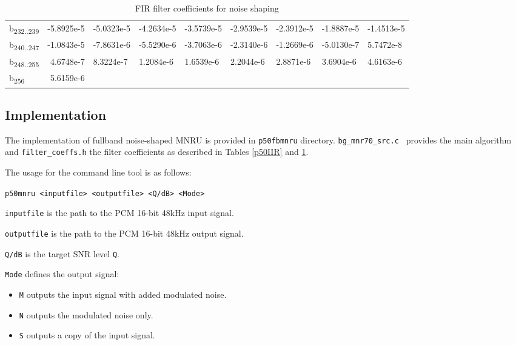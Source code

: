 \begin{table}
{\begin{tabular}{lrlllllll}
        b\textsubscript{232..239} & -5.8925e-5 & -5.0323e-5 & -4.2634e-5 & -3.5739e-5 & -2.9539e-5 & -2.3912e-5 & -1.8887e-5 & -1.4513e-5 \\
        b\textsubscript{240..247} & -1.0843e-5 & -7.8631e-6 & -5.5290e-6 & -3.7063e-6 & -2.3140e-6 & -1.2669e-6 & -5.0130e-7 & 5.7472e-8 \\
        b\textsubscript{248..255} & 4.6748e-7 & 8.3224e-7 & 1.2084e-6 & 1.6539e-6 & 2.2044e-6 & 2.8871e-6 & 3.6904e-6 & 4.6163e-6 \\
        b\textsubscript{256} & 5.6159e-6 &  &  &  &  &  &  &  \\
    \end{tabular}}
    \caption{FIR filter coefficients for noise shaping}
    \label{p50FIR}
\end{table}

\subsection {Implementation}

The implementation of fullband noise-shaped MNRU is provided in {\tt p50fbmnru} directory.
{\tt bg\_mnr70\_src.c } provides the main algorithm and {\tt filter\_coeffs.h} the filter coefficients as described in
Tables \ref{p50IIR} and \ref{p50FIR}.

The usage for the command line tool is as follows:

{\tt p50mnru <inputfile> <outputfile> <Q/dB> <Mode>}


{\tt inputfile} is the path to the PCM 16-bit 48kHz input signal.

{\tt outputfile} is the path to the PCM 16-bit 48kHz output signal.

{\tt Q/dB} is the target SNR level {\tt Q}.


{\tt Mode} defines the output signal:
\begin{itemize}
    \item {\tt M} outputs the input signal with added modulated noise.
    \item {\tt N} outputs the modulated noise only.
    \item {\tt S} outputs a copy of the input signal.
\end{itemize}


